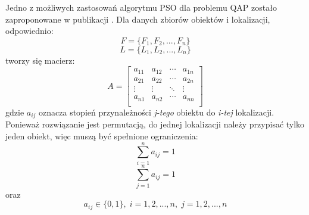 Jedno z możliwych zastosowań algorytmu PSO dla problemu QAP zostało zaproponowane w publikacji \cite{PSO2}. Dla danych zbiorów obiektów i lokalizacji, odpowiednio:
\newline
\begin{equation}
F=\{F_1,F_2,...,F_n\}
\end{equation}
\newline
\begin{equation}
L=\{L_1,L_2,...,L_n\}
\end{equation}
\newline
tworzy się macierz:
\newline
\begin{equation}
\label{PSO_A}
A=
\begin{bmatrix}
a_{11} & a_{12} & \cdots & a_{1n} \\
a_{21} & a_{22} & \cdots & a_{2n} \\
\vdots & \vdots & \ddots & \vdots \\
a_{n1} & a_{n2} & \cdots & a_{nn} \\
\end{bmatrix}
\end{equation}
\newline
gdzie $a_{ij}$ oznacza stopień przynależności \textit{j-tego} obiektu do \textit{i-tej} lokalizacji. Ponieważ  rozwiązanie jest permutacją, do jednej lokalizacji należy przypisać tylko jeden obiekt, więc muszą być spełnione ograniczenia:
\newline
\begin{equation}
\label{pso_suma_po_i}
\sum\limits_{i=1}^n a_{ij}=1
\end{equation}
\newline
\begin{equation}
\label{pso_suma_po_j}
\sum\limits_{j=1}^n a_{ij}=1
\end{equation}
\newline
oraz
\newline
\begin{equation}
a_{ij} \in \{0,1\}, \; i=1,2,...,n, \; j=1,2,...,n
\end{equation}
\newline

